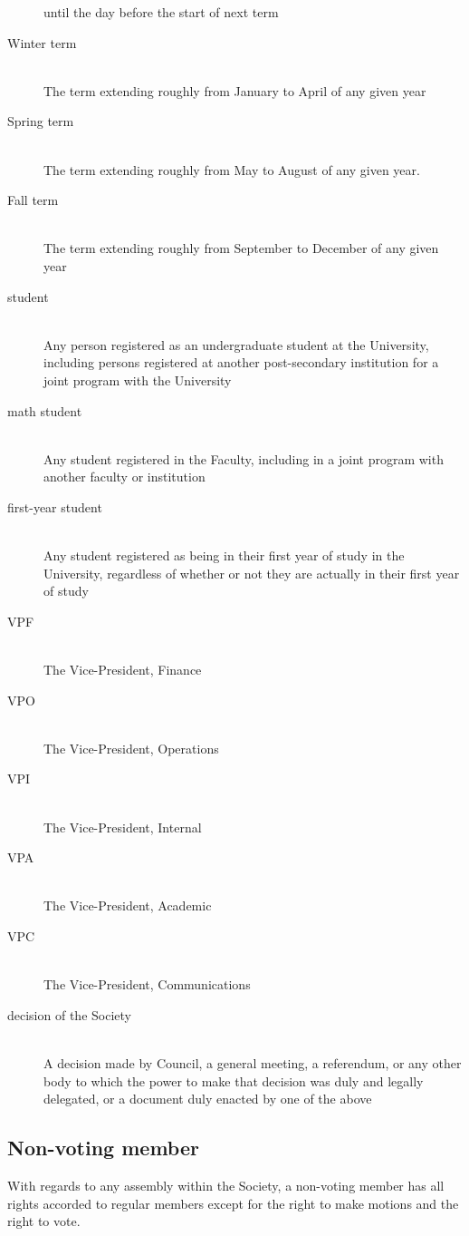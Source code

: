 \begin{description}
  until the day before the start of next term
\item[Winter term]\hfill\\
  The term extending roughly from January to April of any given year
\item[Spring term]\hfill\\
  The term extending roughly from May to August of any given year.
\item[Fall term]\hfill\\
  The term extending roughly from September to December of any given year
\item[student]\hfill\\
  Any person registered as an undergraduate student at the University, including
  persons registered at another post-secondary institution for a joint program
  with the University
\item[math student]\hfill\\
  Any student registered in the Faculty, including in a joint program with
  another faculty or institution
\item[first-year student]\hfill\\
  Any student registered as being in their first year of study in the
  University, regardless of whether or not they are actually in their first year
  of study
\item[VPF]\hfill\\
  The Vice-President, Finance
\item[VPO]\hfill\\
  The Vice-President, Operations
\item[VPI]\hfill\\
  The Vice-President, Internal
\item[VPA]\hfill\\
  The Vice-President, Academic
\item[VPC]\hfill\\
  The Vice-President, Communications
\item[decision of the Society]\hfill\\
  A decision made by Council, a general meeting, a referendum, or any other body
  to which the power to make that decision was duly and legally delegated, or a
  document duly enacted by one of the above
\end{description}

\subsection{Non-voting member}
With regards to any assembly within the Society, a non-voting member has all
rights accorded to regular members except for the right to make motions and
the right to vote.

